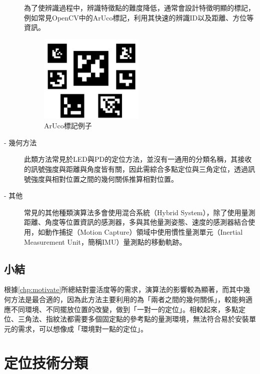 \begin{description}
        \qquad
        為了使辨識過程中，辨識特徵點的難度降低，通常會設計特徵明顯的標記，例如常見OpenCV中的ArUco標記，利用其快速的辨識ID以及距離、方位等資訊。
        
        \begin{figure}[h]
            \centering
            \includegraphics[width=5cm]{ch2pic/aruco.png}
            \caption{ArUco標記例子\cite{pic:aruco}}
            \label{pic:aruco}
        \end{figure}
        
        \item[- 幾何方法] \hfill 
        
        \qquad
        此類方法常見於LED與PD的定位方法，並沒有一通用的分類名稱，其接收的訊號強度與距離與角度皆有關，因此需綜合多點定位與三角定位，透過訊號強度與相對位置之間的幾何關係推算相對位置\cite{survey_light2020}。
        
        \item[- 其他]\hfill 
        
        \qquad
        常見的其他種類演算法多會使用混合系統（Hybrid System）\cite{survey_indoor2018}，除了使用量測距離、角度等位置資訊的感測器，多與其他量測姿態、速度的感測器結合使用，如動作捕捉（Motion Capture）領域中使用慣性量測單元（Inertial Measurement Unit，簡稱IMU）量測點的移動軌跡。

    \end{description}

    \subsection{小結}

    根據\ref{chp:motivate}所總結對靈活度等的需求，演算法的影響較為顯著，而其中幾何方法是最合適的，因為此方法主要利用的為「兩者之間的幾何關係」，較能夠適應不同環境、不同擺放位置的改變，做到「一對一的定位」。相較起來，多點定位、三角法、指紋法都需要多個固定點的參考點的量測環境，無法符合易於安裝單元的需求，可以想像成「環境對一點的定位」。



\section{定位技術分類}
\label{chp:technique}

